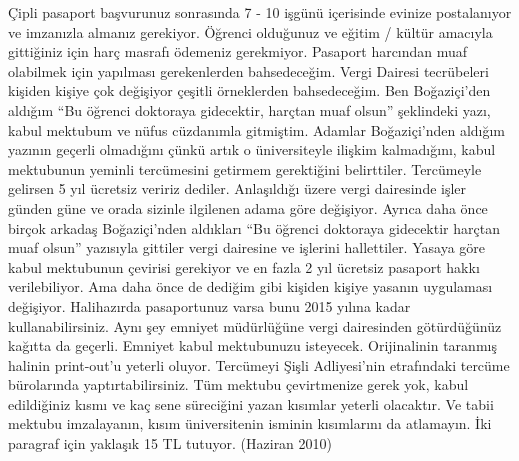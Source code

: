 \documentclass[12pt]{article}
\begin{document}
Çipli pasaport başvurunuz sonrasında 7 - 10 işgünü içerisinde evinize postalanıyor ve imzanızla almanız gerekiyor. Öğrenci olduğunuz ve eğitim / kültür amacıyla gittiğiniz için harç masrafı ödemeniz gerekmiyor. Pasaport harcından muaf olabilmek için yapılması gerekenlerden bahsedeceğim. Vergi Dairesi tecrübeleri kişiden kişiye çok değişiyor çeşitli örneklerden bahsedeceğim. Ben Boğaziçi’den aldığım “Bu öğrenci doktoraya gidecektir, harçtan muaf olsun” şeklindeki yazı, kabul mektubum ve nüfus cüzdanımla gitmiştim. Adamlar Boğaziçi’nden aldığım yazının geçerli olmadığını çünkü artık o üniversiteyle ilişkim kalmadığını, kabul mektubunun yeminli tercümesini getirmem gerektiğini belirttiler. Tercümeyle gelirsen 5 yıl ücretsiz veririz dediler. Anlaşıldığı üzere vergi dairesinde işler günden güne ve orada sizinle ilgilenen adama göre değişiyor. Ayrıca daha önce birçok arkadaş Boğaziçi’nden aldıkları “Bu öğrenci doktoraya gidecektir harçtan muaf olsun” yazısıyla gittiler vergi dairesine ve işlerini hallettiler. Yasaya göre kabul mektubunun çevirisi gerekiyor ve en fazla 2 yıl ücretsiz pasaport hakkı verilebiliyor. Ama daha önce de dediğim gibi kişiden kişiye yasanın uygulaması değişiyor. Halihazırda pasaportunuz varsa bunu 2015 yılına kadar kullanabilirsiniz. Aynı şey emniyet müdürlüğüne vergi dairesinden götürdüğünüz kağıtta da geçerli. Emniyet kabul mektubunuzu isteyecek. Orijinalinin taranmış halinin print-out’u yeterli oluyor. Tercümeyi Şişli Adliyesi’nin etrafındaki tercüme bürolarında yaptırtabilirsiniz. Tüm mektubu çevirtmenize gerek yok, kabul edildiğiniz kısmı ve kaç sene süreciğini yazan kısımlar yeterli olacaktır. Ve tabii mektubu imzalayanın, kısım üniversitenin isminin kısımlarını da atlamayın. İki paragraf için yaklaşık 15 TL tutuyor. (Haziran 2010)
\end{document}

